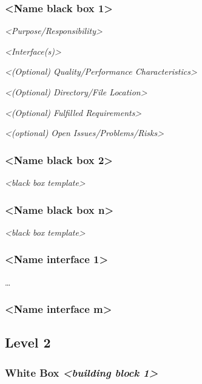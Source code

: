 \documentclass[]{article}
\begin{document}
\subsubsection{\textless{}Name black box
1\textgreater{}}\label{__name_black_box_1}

\emph{\textless{}Purpose/Responsibility\textgreater{}}

\emph{\textless{}Interface(s)\textgreater{}}

\emph{\textless{}(Optional) Quality/Performance
Characteristics\textgreater{}}

\emph{\textless{}(Optional) Directory/File Location\textgreater{}}

\emph{\textless{}(Optional) Fulfilled Requirements\textgreater{}}

\emph{\textless{}(optional) Open Issues/Problems/Risks\textgreater{}}

\subsubsection{\textless{}Name black box
2\textgreater{}}\label{__name_black_box_2}

\emph{\textless{}black box template\textgreater{}}

\subsubsection{\textless{}Name black box
n\textgreater{}}\label{__name_black_box_n}

\emph{\textless{}black box template\textgreater{}}

\subsubsection{\textless{}Name interface
1\textgreater{}}\label{__name_interface_1}

\ldots{}

\subsubsection{\textless{}Name interface
m\textgreater{}}\label{__name_interface_m}

\subsection{Level 2}\label{_level_2}

\subsubsection{\texorpdfstring{White Box \emph{\textless{}building block
1\textgreater{}}}{White Box \textless{}building block 1\textgreater{}}}\label{_white_box_emphasis_building_block_1_emphasis}
\end{document}
